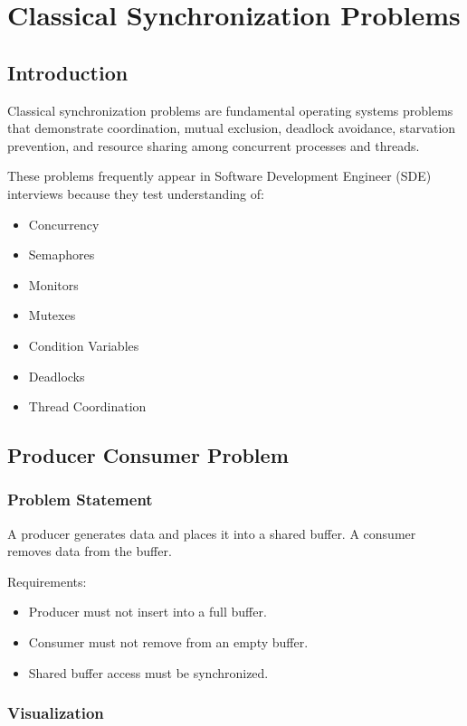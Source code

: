 \chapter{Classical Synchronization Problems}

\section{Introduction}

Classical synchronization problems are fundamental operating systems problems that demonstrate coordination, mutual exclusion, deadlock avoidance, starvation prevention, and resource sharing among concurrent processes and threads.

These problems frequently appear in Software Development Engineer (SDE) interviews because they test understanding of:

\begin{itemize}
\item Concurrency
\item Semaphores
\item Monitors
\item Mutexes
\item Condition Variables
\item Deadlocks
\item Thread Coordination
\end{itemize}

\section{Producer Consumer Problem}

\subsection{Problem Statement}

A producer generates data and places it into a shared buffer. A consumer removes data from the buffer.

Requirements:

\begin{itemize}
\item Producer must not insert into a full buffer.
\item Consumer must not remove from an empty buffer.
\item Shared buffer access must be synchronized.
\end{itemize}

\subsection{Visualization}

